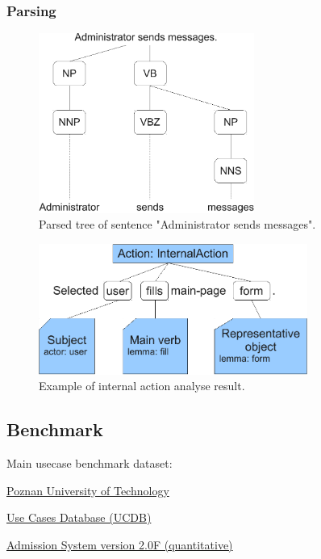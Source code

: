 \subsubsection{Parsing}

\begin{figure}[ht]
  \centering
  \includegraphics[width=200pt]{images/ParsedTree}
  \caption{Parsed tree of sentence "Administrator sends messages".}
  \label{fig:ParsedTree}
\end{figure}

\begin{figure}[ht]
  \centering
  \includegraphics[width=250pt]{images/InternalActionExample}
  \caption{Example of internal action analyse result.}
  \label{fig:InternalActionExample}
\end{figure}


\subsection{Benchmark}
\label{sec:benchmark}

Main usecase benchmark dataset:

\href{http://www2.put.poznan.pl/en}{Poznan University of Technology}

\href{http://www.se.cs.put.poznan.pl/knowledge-base/software-projects-database/use-cases-database-ucdb/use-cases-database-ucdb}{Use Cases Database (UCDB)}

\href{http://ucdb.cs.put.poznan.pl/benchmark/2.f.n/srs/index.html}{Admission System version 2.0F (quantitative)}


